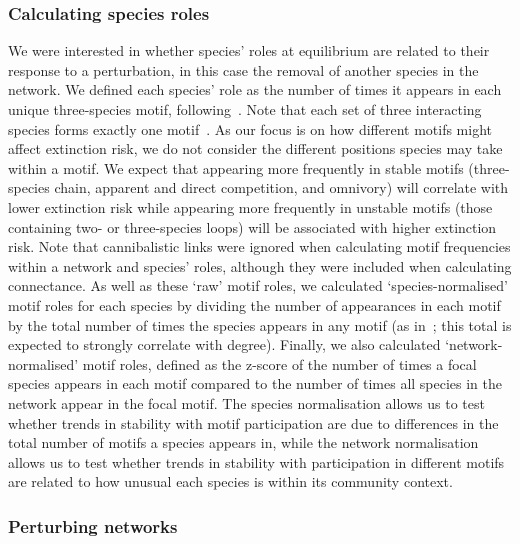 \documentclass[12pt]{article}
\begin{document}
\begin{spacing}{2.0}
    
    	\subsubsection*{Calculating species roles}
    
    
    		We were interested in whether species' roles at equilibrium are related to their response to a perturbation, in this case the removal of another species in the network. We defined each species' role as the number of times it appears in each unique three-species motif, following~\citet{Stouffer2012,Cirtwill2015}. Note that each set of three interacting species forms exactly one motif~\citep{Cirtwill2018FoodWebs}. As our focus is on how different motifs might affect extinction risk, we do not consider the different positions species may take within a motif. We expect that appearing more frequently in stable motifs (three-species chain, apparent and direct competition, and omnivory) will correlate with lower extinction risk while appearing more frequently in unstable motifs (those containing two- or three-species loops) will be associated with higher extinction risk.	Note that cannibalistic links were ignored when calculating motif frequencies within a network and species' roles, although they were included when calculating connectance. As well as these `raw' motif roles, we calculated `species-normalised' motif roles for each species by dividing the number of appearances in each motif by the total number of times the species appears in any motif (as in~\citet{Cirtwill2015}; this total is expected to strongly correlate with degree). Finally, we also calculated `network-normalised' motif roles, defined as the z-score of the number of times a focal species appears in each motif compared to the number of times all species in the network appear in the focal motif.
    		The species normalisation allows us to test whether trends in stability with motif participation are due to differences in the total number of motifs a species appears in, while the network normalisation allows us to test whether trends in stability with participation in different motifs are related to how unusual each species is within its community context.
    
    
    	\subsubsection*{Perturbing networks}
    

\end{spacing}
\end{document}
